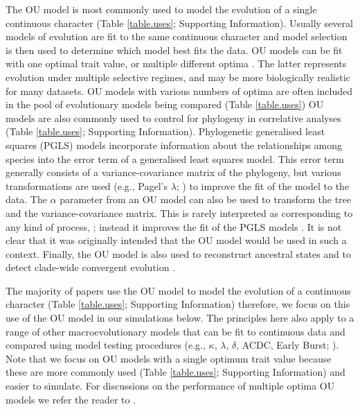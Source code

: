 \documentclass[a4paper,12pt]{article}
\begin{document}
  The OU model is most commonly used to model the evolution of a single continuous character (Table \ref{table.uses}; Supporting Information). 
  Usually several models of evolution \citep[e.g., Brownian motion, OU, Early burst etc.;][]{Harmon:2010aa,cooper2010body} are fit to the same continuous character and model selection is then used to determine which model best fits the data.  
  OU models can be fit with one optimal trait value, or multiple different optima \citep{Butler:2004aa,beaulieu2012modeling}. 
  The latter represents evolution under multiple selective regimes, and may be more biologically realistic for many datasets. 
  OU models with various numbers of optima are often included in the pool of evolutionary models being compared \citep[e.g.,][]{christin2013anatomical}(Table \ref{table.uses})
  OU models are also commonly used to control for phylogeny in correlative analyses (Table \ref{table.uses}; Supporting Information).  
  Phylogenetic generalised least squares (PGLS) models incorporate information about the relationships among species into the error term of a generalised least squares model. 
  This error term generally consists of a variance-covariance matrix of the phylogeny, but various transformations are used (e.g., Pagel's $\lambda$; \citealp{Pagel:1997aa}) to improve the fit of the model to the data. 
  The $\alpha$ parameter from an OU model can also be used to transform the tree and the variance-covariance matrix.
  This is rarely interpreted as corresponding to any kind of process,
  ; instead it improves the fit of the PGLS models \citep[e.g.,][]{blankers2012ecological}. 
  It is not clear that it was originally intended that the OU model would be used in such a context.
  Finally, the OU model is also used to reconstruct ancestral states \citep{martins1999estimation} and to detect clade-wide convergent evolution \citep{ingram2013surface}. 

  The majority of papers use the OU model to model the evolution of a continuous character (Table \ref{table.uses}; Supporting Information) therefore, we focus on this use of the OU model in our simulations below. 
  The principles here also apply to a range of other macroevolutionary models that can be fit to continuous data and compared using model testing procedures (e.g., $\kappa$, $\lambda$, $\delta$, ACDC, Early Burst; \citealp{Pagel:1997aa,Pagel:1999aa,Blomberg:2003aa,Harmon:2008aa}).
  Note that we focus on OU models with a single optimum trait value because these are more commonly used (Table \ref{table.uses}; Supporting Information) and easier to simulate.  For discussions on the performance of multiple optima OU models we refer the reader to \citep{beaulieu2012ouwie}.
\end{document}
